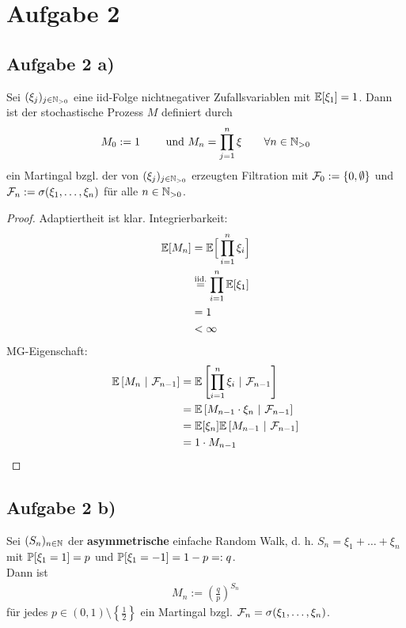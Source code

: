 \documentclass[12pt,a4paper]{article}
\begin{document}
\section*{Aufgabe 2}
\subsection*{Aufgabe 2 a)}
Sei $(\xi_j)_{j\in\N_{>0}}$ eine iid-Folge nichtnegativer Zufallsvariablen mit $\E[\xi_1]=1$. Dann ist der stochastische Prozess $M$ definiert durch
\begin{align*}
M_0:=1\qquad\text{ und }M_n=\prod\limits_{j=1}^n\xi\qquad\forall n\in\N_{>0}
\end{align*}
ein Martingal bzgl. der von $(\xi_j)_{j\in\N_{>0}}$ erzeugten Filtration  mit $\F_0:=\lbrace 0,\emptyset\rbrace$ und $\F_n:=\sigma(\xi_1,\ldots,\xi_n)$ für alle $n\in\N_{>0}$.

\begin{proof}
	Adaptiertheit ist klar. Integrierbarkeit:
	\begin{align*}
		\E[M_n]
		&=\E\Big[\prod_{i=1}^n \xi_i\Big] \\
		&\stackeq{\text{iid.}}\prod_{i=1}^n \E[\xi_1] \\
		&= 1 \\
		&<\infty
	\end{align*}
	MG-Eigenschaft:
	\begin{align*}
		\BedE{M_n}{\F_{n-1}}
		&= \BedE{\prod_{i=1}^n \xi_i}{\F_{n-1}} \\
		&= \BedE{M_{n-1} \cdot \xi_n}{\F_{n-1}} \\
		&= \E[\xi_n] \BedE{M_{n-1}}{\F_{n-1}} \\
		&= 1 \cdot M_{n-1}
	\end{align*}

\end{proof}

\subsection*{Aufgabe 2 b)}
Sei $(S_n)_{n\in\N}$ der \textbf{asymmetrische} einfache Random Walk, d. h. $S_n=\xi_1+\ldots+\xi_n$ mit $\P[\xi_1=1]=p$ und $\P[\xi_1=-1]=1-p=:q$.\\
Dann ist 
\begin{align*}
M_n:=\left(\frac{q}{p}\right)^{S_n}
\end{align*}
für jedes $p\in (0,1)\setminus\left\lbrace\frac{1}{2}\right\rbrace$ ein Martingal bzgl. $\F_n=\sigma(\xi_1,\ldots,\xi_n)$.
\end{document}
